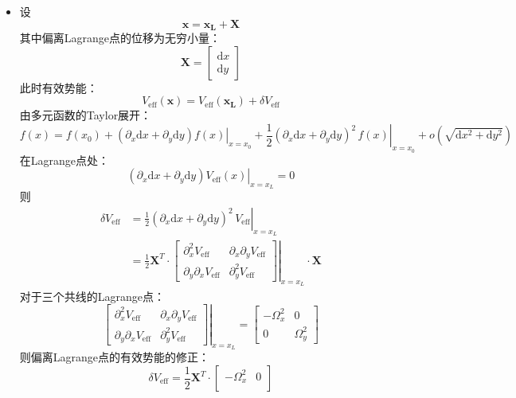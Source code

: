 \documentclass[a4paper,fontset=windows]{ctexart}
\begin{document}
\begin{itemize}
        \item[4.]
        设
        \[
        \bm{x} = \bm{x_L} + \bm{X}
        \]
        其中偏离Lagrange点的位移为无穷小量：
        \[
        \bm{X} =
        \begin{bmatrix}
            \mathrm{d}x \\
            \mathrm{d}y
        \end{bmatrix}
        \]
        此时有效势能：
        \[
        V_{\mathrm{eff}}(\bm{x}) = V_{\mathrm{eff}}(\bm{x_L}) + \delta V_{\mathrm{eff}}
        \]
        由多元函数的Taylor展开：
        \[
        f(x) = f(x_0) + \left.(\partial_x\mathrm{d}x + \partial_y\mathrm{d}y)f(x)\right|_{x = x_0} + \frac{1}{2}\left.(\partial_x\mathrm{d}x + \partial_y\mathrm{d}y)^2\, f(x)\right|_{x = x_0} + o(\sqrt{\mathrm{d}x^2 + \mathrm{d}y^2})
        \]
        在Lagrange点处：
        \[
        \left.(\partial_x\mathrm{d}x + \partial_y\mathrm{d}y)V_{\mathrm{eff}}(x)\right|_{x = x_L} = 0
        \]
        则
        \begin{align*}
        \delta V_{\mathrm{eff}}
        &= \frac{1}{2}\left.(\partial_x\mathrm{d}x + \partial_y\mathrm{d}y)^2\, V_{\mathrm{eff}}\right|_{x = x_L} \\
        &= \frac{1}{2}\bm{X}^T\cdot\left.
        \begin{bmatrix}
            \partial_x^2 V_{\mathrm{eff}} &\partial_x\partial_y V_{\mathrm{eff}} \\
            \partial_y\partial_x V_{\mathrm{eff}} &\partial_y^2 V_{\mathrm{eff}}
        \end{bmatrix}\right|_{x=x_L}
        \cdot\bm{X}
        \end{align*}
        对于三个共线的Lagrange点：
        \[
        \left.\begin{bmatrix}
            \partial_x^2 V_{\mathrm{eff}} &\partial_x\partial_y V_{\mathrm{eff}} \\
            \partial_y\partial_x V_{\mathrm{eff}} &\partial_y^2 V_{\mathrm{eff}}
        \end{bmatrix}\right|_{x=x_L}
        =
        \begin{bmatrix}
            -\varOmega_x^2 &0 \\
            0 &\varOmega_y^2
        \end{bmatrix}
        \]
        则偏离Lagrange点的有效势能的修正：
        \[
        \delta V_{\mathrm{eff}} = \frac{1}{2}\bm{X}^T\cdot
        \begin{bmatrix}
            -\varOmega_x^2 &0 \\

\end{bmatrix}\]
\end{itemize}
\end{document}
